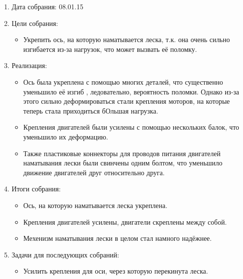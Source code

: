 \begin{enumerate}
  	
  \item Дата собрания: 08.01.15
	
  \item Цели собрания: 
  \begin{itemize}
    \item Укрепить ось, на которую наматывается леска, т.к. она очень сильно изгибается из-за нагрузок, что может вызвать её поломку.
		
  \end{itemize}

  \item Реализация:
  \begin{itemize}
    \item Ось была укреплена с помощью многих деталей, что существенно уменьшило её изгиб , ледовательно, вероятность поломки. Однако из-за этого сильно деформироваться стали крепления моторов, на которые теперь стала приходиться бОльшая нагрузка.
	
	\item Крепления двигателей были усилены с помощью нескольких балок, что уменьшило их деформацию.
    
    \item Также пластиковые коннекторы для проводов питания двигателей наматывания лески были свинчены одним болтом, что уменьшило движение двигателей друг относительно друга.
  
  \end{itemize}
	
  \item Итоги собрания:
  \begin{itemize}
	\item Ось, на которую наматывается леска укреплена.
    
    \item Крепления двигателей усилены, двигатели скреплены между собой.
    
	\item Мехенизм наматывания лески в целом стал намного надёжнее.
	
  \end{itemize}
	
  \item Задачи для последующих собраний:
  \begin{itemize}
    \item Усилить крепления для оси, через которую перекинута леска.
  \end{itemize}
\end{enumerate}
\fillpage